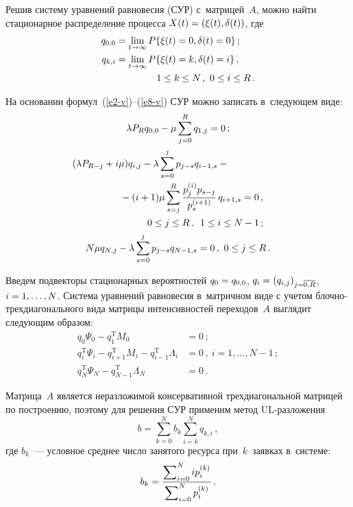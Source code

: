 \begin{multicols}{2}
  Решив систему уравнений равновесия (СУР) 
  с~матрицей~$A$, можно найти стационарное распределение 
процесса $X(t)\hm= (\xi(t),\delta(t))$, где 
  \begin{align*}
  q_{0,0}& = \lim\limits_{t\to\infty} P\{\xi(t)=0,\delta(t)=0\}\,;\\
  q_{k,i} &=\lim\limits_{t\to\infty} P\{\xi(t)=k,\delta(t)=i\}\,,\\
  &\hspace*{15mm} 1\leq k\leq N\,,\ 0\leq 
i\leq R\,.
  \end{align*}
  
  На основании формул~(\ref{e2-v})--(\ref{e8-v}) СУР можно записать в~следующем виде:
  \begin{gather*}
  \lambda P_R q_{0,0} -\mu \sum\limits_{j=0}^R q_{1,j}=0\,;\\
  \hspace*{-20mm}(\lambda P_{R-j}+i\mu)q_{i,j}-\lambda \sum\limits_{s=0}^j p_{j-s} q_{i-1,s} -{}\\
 \hspace*{10mm} {}- 
(i+1) \mu \sum\limits_{s=j}^R \fr{p_j^{(i)} p_{s-j}}{p_s^{(i+1)}}\,q_{i+1,s}=0\,,\\
  \hspace*{20mm}0\leq j\leq R\,,\enskip 1\leq i\leq N-1\,;\\
  N\mu q_{N,j} -\lambda \sum\limits_{s=0}^j p_{j-s} q_{N-1,s}=0\,,\ 0\leq j\leq 
R\,.
  \end{gather*}
  
  Введем подвекторы стационарных вероятностей $q_0\hm= q_{0,0}$, 
$q_i\hm= (q_{i,j})_{j=\overline{0,R}}$, $i\hm= 1,\ldots ,N$. Сис\-те\-ма урав\-не\-ний
равновесия в~мат\-рич\-ном 
виде с учетом блоч\-но-трех\-диа\-го\-наль\-но\-го вида матрицы 
интенсивностей переходов~$A$ выглядит следующим образом:
  \begin{align*}
  q_0\Psi_0-q_1^{\mathrm{T}} {M}_0&=0\,;\\
  q_i^{\mathrm{T}} \Psi_i -q_{i+1}^{\mathrm{T}} {M}_i -q_{i-1}^{\mathrm{T}} \Lambda_i &=0\,,\ i=1,\ldots, 
N-1\,;\\
  q_N^{\mathrm{T}} \Psi_N-q_{N-1}^{\mathrm{T}} \Lambda_N&=0\,.
  \end{align*}
  
  Матрица~$A$ является неразложимой консервативной трехдиагональной 
матрицей по по\-стро\-ению, поэтому для решения СУР применим метод  
UL-раз\-ло\-же\-ния~\cite{1-v}
  $$
  b= \sum\limits_{k=0}^N b_k \sum\limits_{i=k}^N q_{k,i}\,,
  $$
  где $b_k$~--- условное среднее число занятого ресурса при~$k$~заявках 
в~системе:
  $$
  b_k= \displaystyle\frac{\displaystyle \sum\nolimits_{i=0}^N i p_i^{(k)}\mathstrut}{\displaystyle \sum\nolimits_{i=0}^N 
p_i^{(k)}\mathstrut}\,.
  $$
  

\end{multicols}
